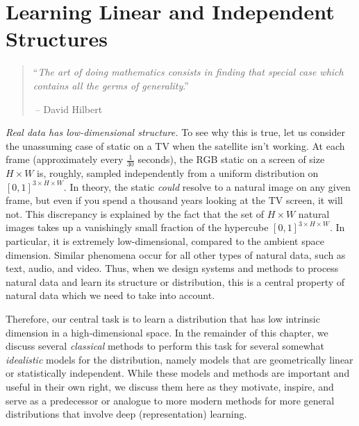\documentclass[../../book-main.tex]{subfiles}
\begin{document}
\chapter{Learning Linear and Independent Structures}
\label{ch:classic-models}

\begin{quote}
    \hfill  ``{\em The art of doing mathematics consists in finding
    that special case which contains all the germs of generality}.''

    $~$\hfill -- David Hilbert
\end{quote}
\vspace{5mm}

\textit{Real data has low-dimensional structure.} To see why this is
true, let us consider the unassuming case of static on a TV when the
satellite isn't working. At each frame (approximately every
\(\frac{1}{30}\) seconds), the RGB static on a screen of size \(H
\times W\) is, roughly, sampled independently from a uniform
distribution on \([0, 1]^{3 \times H \times W}\). In theory, the
static \textit{could} resolve to a natural image on any given frame,
but even if you spend a thousand years looking at the TV screen, it
will not. This discrepancy is explained by the fact that the set of
\(H \times W\) natural images takes up a vanishingly small fraction
of the hypercube \([0, 1]^{3 \times H \times W}\). In particular, it
is extremely low-dimensional, compared to the ambient space
dimension. Similar phenomena occur for all other types of natural
data, such as text, audio, and video. Thus, when we design systems
and methods to process natural data and learn its structure or
distribution, this is a central property of natural data which we
need to take into account. %

Therefore, our central task is to learn a distribution that has low
intrinsic dimension in a high-dimensional space. In the remainder of
this chapter, we discuss several \textit{classical} methods to
perform this task for several somewhat {\em idealistic} models for
the distribution, namely models that are geometrically linear or
statistically independent. While these models and methods are
important and useful in their own right, we discuss them here as they
motivate, inspire, and serve as a predecessor or analogue to more
modern methods for more general distributions that involve deep
(representation) learning.
\end{document}
